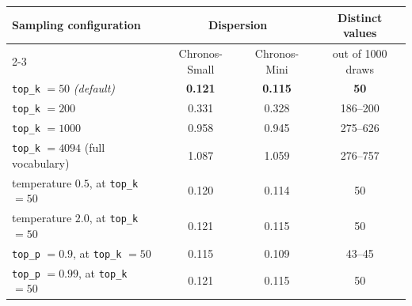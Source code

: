 \begin{tabular}{lccc}
\toprule
Sampling configuration & \multicolumn{2}{c}{Dispersion} & Distinct values \\
\cmidrule(lr){2-3}
 & Chronos-Small & Chronos-Mini & out of 1000 draws \\
\midrule
\texttt{top\_k} $=50$ \emph{(default)} & \textbf{0.121} & \textbf{0.115} & \textbf{50} \\
\texttt{top\_k} $=200$ & 0.331 & 0.328 & 186--200 \\
\texttt{top\_k} $=1000$ & 0.958 & 0.945 & 275--626 \\
\texttt{top\_k} $=4094$ (full vocabulary) & 1.087 & 1.059 & 276--757 \\
\midrule
temperature $0.5$, at \texttt{top\_k} $=50$ & 0.120 & 0.114 & 50 \\
temperature $2.0$, at \texttt{top\_k} $=50$ & 0.121 & 0.115 & 50 \\
\texttt{top\_p} $=0.9$, at \texttt{top\_k} $=50$ & 0.115 & 0.109 & 43--45 \\
\texttt{top\_p} $=0.99$, at \texttt{top\_k} $=50$ & 0.121 & 0.115 & 50 \\
\bottomrule
\end{tabular}

